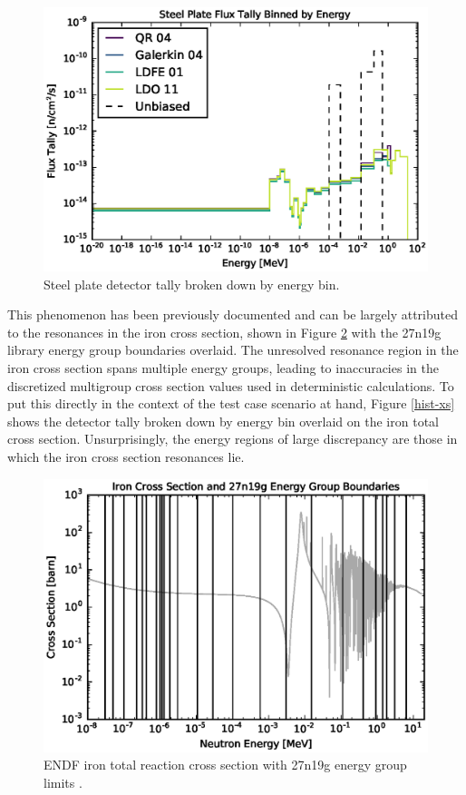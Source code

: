 \begin{figure}[!htb]
\centering
\includegraphics[max height=0.445\textheight]{img/steel-plots/mcnp/ebin-hist.eps}
\caption{Steel plate detector tally broken down by energy bin.}
\label{steel-tally-bin}
\end{figure}

\noindent This phenomenon has been 
previously documented \cite{wilsonslaybaugh} and can be largely attributed to the 
resonances in the iron cross section, shown in Figure \ref{fe-xs} with the 27n19g 
library energy group boundaries overlaid. The unresolved resonance region in the iron
cross section spans multiple energy groups, leading to inaccuracies in the discretized
multigroup cross section values used in deterministic calculations. To put this
directly in the context of the test case scenario at hand, Figure \ref{hist-xs} shows
the detector tally broken down by energy bin overlaid on the iron total cross section.
Unsurprisingly, the energy regions of large discrepancy are those in which the iron
cross section resonances lie.

\begin{figure}[!htb]
\centering
\includegraphics[max height=0.445\textheight]{img/steel-plots/fe-xs.eps}
\caption{ENDF iron total reaction cross section with 27n19g energy group limits 
         \cite{endf, advantg}.}
\label{fe-xs}
\end{figure}

